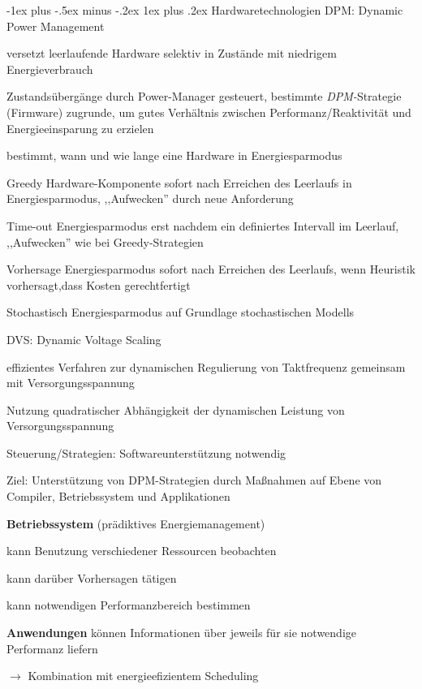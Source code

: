 \documentclass[a4paper]{article}
\makeatletter
\renewcommand{\subsubsection}{\@startsection{subsubsection}{3}{0mm}%
 {-1ex plus -.5ex minus -.2ex}%
 {1ex plus .2ex}%
 {\normalfont\small\bfseries}}
\makeatother
\begin{document}
\begin{multicols}{3}
    \subsubsection{Hardwaretechnologien}
    DPM: Dynamic Power Management
    \begin{itemize*}
        \item versetzt leerlaufende Hardware selektiv in Zustände mit niedrigem Energieverbrauch
        \item Zustandsübergänge durch Power-Manager gesteuert, bestimmte \emph{DPM-}Strategie (Firmware) zugrunde, um gutes Verhältnis zwischen Performanz/Reaktivität und Energieeinsparung zu erzielen
        \item bestimmt, wann und wie lange eine Hardware in Energiesparmodus
    \end{itemize*}
    \begin{description*}
        \item[Greedy] Hardware-Komponente sofort nach Erreichen des Leerlaufs in Energiesparmodus, ,,Aufwecken'' durch neue Anforderung
        \item[Time-out] Energiesparmodus erst nachdem ein definiertes Intervall im Leerlauf, ,,Aufwecken'' wie bei Greedy-Strategien
        \item[Vorhersage] Energiesparmodus sofort nach Erreichen des Leerlaufs, wenn Heuristik vorhersagt,dass Kosten gerechtfertigt
        \item[Stochastisch] Energiesparmodus auf Grundlage stochastischen Modells
    \end{description*}

    DVS: Dynamic Voltage Scaling
    \begin{itemize*}
        \item effizientes Verfahren zur dynamischen Regulierung von Taktfrequenz gemeinsam mit Versorgungsspannung
        \item Nutzung quadratischer Abhängigkeit der dynamischen Leistung von Versorgungsspannung
        \item Steuerung/Strategien: Softwareunterstützung notwendig
        \item Ziel: Unterstützung von DPM-Strategien durch Maßnahmen auf Ebene von Compiler, Betriebssystem und Applikationen
        \item \textbf{Betriebssystem} (prädiktives Energiemanagement)
        \begin{itemize*}
            \item kann Benutzung verschiedener Ressourcen beobachten
            \item kann darüber Vorhersagen tätigen
            \item kann notwendigen Performanzbereich bestimmen
        \end{itemize*}
        \item \textbf{Anwendungen} können Informationen über jeweils für sie notwendige Performanz liefern
        \item[$\rightarrow$] Kombination mit energieefizientem Scheduling
    \end{itemize*}


\end{multicols}
\end{document}
